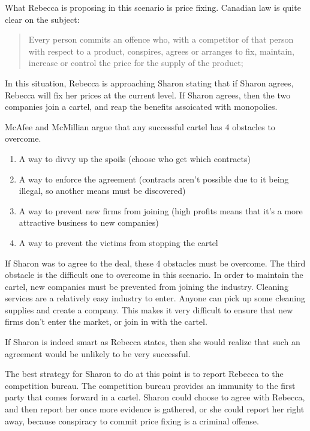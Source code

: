 \documentclass[12pt]{article}
\begin{document}
What Rebecca is proposing in this scenario is price fixing. Canadian law is quite clear on the subject: \cite[45.1.a]{compAct}

\begin{quotation}
Every person commits an offence who, with a competitor of that person with respect to a product, conspires, agrees or arranges to fix, maintain, increase or control the price for the supply of the product;
\end{quotation}

In this situation, Rebecca is approaching Sharon stating that if Sharon agrees, Rebecca will fix her prices at the current level. If Sharon agrees, then the two companies join a cartel, and reap the benefits assoicated with monopolies.

McAfee and McMillian\cite[pg. 1]{biddingRings} argue that any successful cartel has 4 obstacles to overcome. 

\begin{enumerate}
\item A way to divvy up the spoils (choose who get which contracts)
\item A way to enforce the agreement (contracts aren't possible due to it being illegal, so another means must be discovered)
\item A way to prevent new firms from joining (high profits means that it's a more attractive business to new companies)
\item A way to prevent the victims from stopping the cartel
\end{enumerate}

If Sharon was to agree to the deal, these 4 obstacles must be overcome. The third obstacle is the difficult one to overcome in this scenario. In order to maintain the cartel, new companies must be prevented from joining the industry. Cleaning services are a relatively easy industry to enter. Anyone can pick up some cleaning supplies and create a company. This makes it very difficult to ensure that new firms don't enter the market, or join in with the cartel.

If Sharon is indeed smart as Rebecca states, then she would realize that such an agreement would be unlikely to be very successful.

The best strategy for Sharon to do at this point is to report Rebecca to the competition bureau. The competition bureau provides an immunity \cite{immunity} to the first party that comes forward in a cartel. Sharon could choose to agree with Rebecca, and then report her once more evidence is gathered, or she could report her right away, because conspiracy to commit price fixing is a criminal offense.\cite[45.1.a]{compAct}
\end{document}
